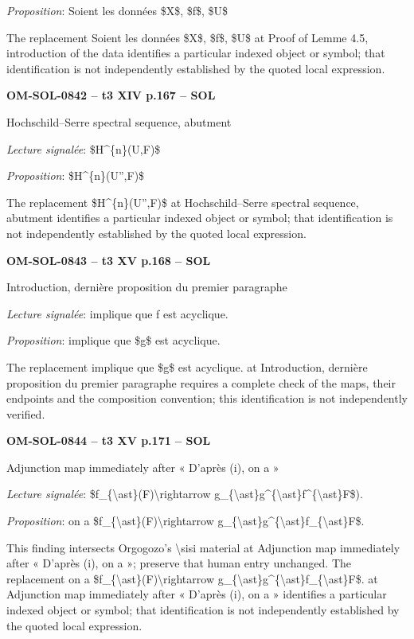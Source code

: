 \emph{Proposition}: Soient les données \$X\$, \$f\$, \$U\$\par
The replacement Soient les données \$X\$, \$f\$, \$U\$ at Proof of Lemme 4.5, introduction of the data identifies a particular indexed object or symbol; that identification is not independently established by the quoted local expression.\par
\par\noindent\textbf{OM-SOL-0842 -- t3 XIV p.167 -- SOL}\par
Hochschild–Serre spectral sequence, abutment\par
\emph{Lecture signalée}: \$H\textasciicircum{}\{n\}(U,F)\$\par
\emph{Proposition}: \$H\textasciicircum{}\{n\}(U'',F)\$\par
The replacement \$H\textasciicircum{}\{n\}(U'',F)\$ at Hochschild–Serre spectral sequence, abutment identifies a particular indexed object or symbol; that identification is not independently established by the quoted local expression.\par
\par\noindent\textbf{OM-SOL-0843 -- t3 XV p.168 -- SOL}\par
Introduction, dernière proposition du premier paragraphe\par
\emph{Lecture signalée}: implique que f est acyclique.\par
\emph{Proposition}: implique que \$g\$ est acyclique.\par
The replacement implique que \$g\$ est acyclique. at Introduction, dernière proposition du premier paragraphe requires a complete check of the maps, their endpoints and the composition convention; this identification is not independently verified.\par
\par\noindent\textbf{OM-SOL-0844 -- t3 XV p.171 -- SOL}\par
Adjunction map immediately after « D'après (i), on a »\par
\emph{Lecture signalée}: \$f\_\{\textbackslash{}ast\}(F)\textbackslash{}rightarrow g\_\{\textbackslash{}ast\}g\textasciicircum{}\{\textbackslash{}ast\}f\textasciicircum{}\{\textbackslash{}ast\}F\$).\par
\emph{Proposition}: on a \$f\_\{\textbackslash{}ast\}(F)\textbackslash{}rightarrow g\_\{\textbackslash{}ast\}g\textasciicircum{}\{\textbackslash{}ast\}f\_\{\textbackslash{}ast\}F\$.\par
This finding intersects Orgogozo's \textbackslash{}sisi material at Adjunction map immediately after « D'après (i), on a »; preserve that human entry unchanged. The replacement on a \$f\_\{\textbackslash{}ast\}(F)\textbackslash{}rightarrow g\_\{\textbackslash{}ast\}g\textasciicircum{}\{\textbackslash{}ast\}f\_\{\textbackslash{}ast\}F\$. at Adjunction map immediately after « D'après (i), on a » identifies a particular indexed object or symbol; that identification is not independently established by the quoted local expression.\par
